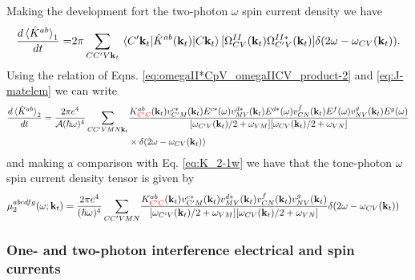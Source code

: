 \documentclass{article}
\newcommand{\kt}{\mathbf{k}_{t}}
\begin{document}
Making the development fort the two-photon $\omega$ spin current density
we have 
\begin{equation*}
\begin{split}
\frac{d \ev*{\hat{K}^{ab}}_{1}}{dt} =& 2\pi \sum_{CC'V\kt} \mel*{C'\kt}
{\hat{K}^{ab}(\kt)}{C\kt} [\Omega^{II}_{CV}(\kt) \Omega^{II*}_{C'V}(\kt)] 
\delta(2\omega - \omega_{CV}(\kt)) . \\
\end{split}
\end{equation*}
Using the relation of Eqns. \eqref{eq:omegaII*CpV_omegaIICV_product-2}
and \eqref{eq:J-matelem} we can write
\begin{equation}
\begin{split}
\frac{d\ev*{\hat{K}^{ab}}_{2}}{dt} = \frac{2 \pi e^{4}}{\mathcal{A} 
(\hbar \omega)^{4}} \sum_{CC'VMN\kt} & \frac{K^{ab}_{\color{red}{C'C}}(\kt) 
v^{c*}_{C'M}(\kt)E^{c*}(\omega) v^{d*}_{MV}(\kt) E^{d*}(\omega) 
v^{f}_{CN}(\kt) E^{f}(\omega) v^{g}_{NV}(\kt) E^{g}(\omega) }
{[\omega_{C'V}(\kt)/2 + \omega_{VM}] [\omega_{CV}(\kt)/2 + \omega_{VN}]} \\
& \times \delta(2\omega - \omega_{CV}(\kt))
\end{split}
\end{equation}
and making a comparison with Eq. \eqref{eq:K_2-1w} we have that the tone-photon
$\omega$ spin current density tensor is given by
\begin{equation}
\begin{split}
  \mu^{abcdfg}_{2}(\omega;\kt) = \frac{2 \pi e^{4}}{(\hbar \omega)^{4}} 
\sum_{CC'VMN} & \frac{K^{ab}_{\color{red}{C'C}}(\kt) 
v^{c*}_{C'M}(\kt) v^{d*}_{MV}(\kt) v^{f}_{CN}(\kt) v^{g}_{NV}(\kt) }
{[\omega_{C'V}(\kt)/2 + \omega_{VM}] [\omega_{CV}(\kt)/2 + \omega_{VN}]} 
\delta(2\omega - \omega_{CV}(\kt))
\end{split}
\end{equation}

\subsubsection{One- and two-photon interference electrical and spin currents}
\end{document}
